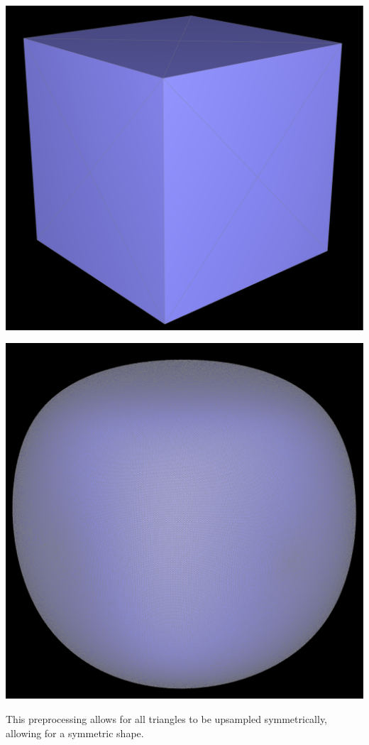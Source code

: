 \documentclass{article}
\begin{document}
\begin{center}
    \includegraphics[]{task 6/symcube.png}

    \includegraphics[]{task 6/symcubeend.png}
\end{center}
This preprocessing allows for all triangles to be upsampled symmetrically, allowing for a symmetric shape.
\end{document}
